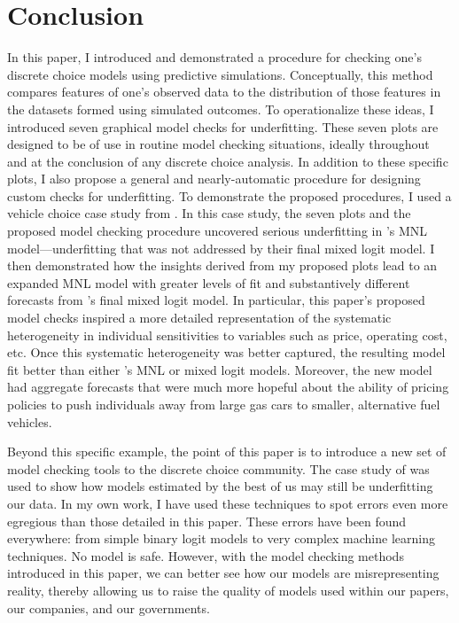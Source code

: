 \documentclass[preprint]{elsarticle}
\begin{document}
\section{Conclusion}
\label{sec:conclusion}
In this paper, I introduced and demonstrated a procedure for checking one's discrete choice models using predictive simulations. Conceptually, this method compares features of one's observed data to the distribution of those features in the datasets formed using simulated outcomes. To operationalize these ideas, I introduced seven graphical model checks for underfitting. These seven plots are designed to be of use in routine model checking situations, ideally throughout and at the conclusion of any discrete choice analysis. In addition to these specific plots, I also propose a general and nearly-automatic procedure for designing custom checks for underfitting. To demonstrate the proposed procedures, I used a vehicle choice case study from \citet{brownstone_forecasting_1998}. In this case study, the seven plots and the proposed model checking procedure uncovered serious underfitting in \citeauthor{brownstone_forecasting_1998}'s MNL model---underfitting that was not addressed by their final mixed logit model. I then demonstrated how the insights derived from my proposed plots lead to an expanded MNL model with greater levels of fit and substantively different forecasts from \citeauthor{brownstone_forecasting_1998}'s final mixed logit model. In particular, this paper's proposed model checks inspired a more detailed representation of the systematic heterogeneity in individual sensitivities to variables such as price, operating cost, etc. Once this systematic heterogeneity was better captured, the resulting model fit better than either \citeauthor{brownstone_forecasting_1998}'s MNL or mixed logit models. Moreover, the new model had aggregate forecasts that were much more hopeful about the ability of pricing policies to push individuals away from large gas cars to smaller, alternative fuel vehicles.

Beyond this specific example, the point of this paper is to introduce a new set of model checking tools to the discrete choice community. The case study of \citet{brownstone_forecasting_1998} was used to show how models estimated by the best of us may still be underfitting our data. In my own work, I have used these techniques to spot errors even more egregious than those detailed in this paper. These errors have been found everywhere: from simple binary logit models to very complex machine learning techniques. No model is safe. However, with the model checking methods introduced in this paper, we can better see how our models are misrepresenting reality, thereby allowing us to raise the quality of models used within our papers, our companies, and our governments.
\end{document}
